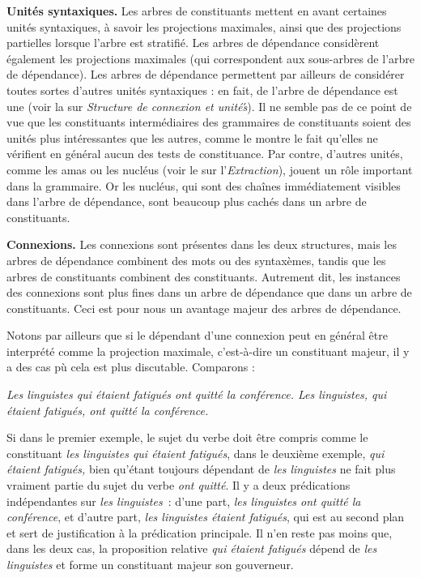 {    \smallskip\noindent\textbf{Unités syntaxiques.}
    Les arbres de constituants mettent en avant certaines unités syntaxiques, à savoir les projections maximales, ainsi que des projections partielles lorsque l’arbre est stratifié. Les arbres de dépendance considèrent également les projections maximales (qui correspondent aux sous-arbres de l’arbre de dépendance). Les arbres de dépendance permettent par ailleurs de considérer toutes sortes d’autres unités syntaxiques : en fait,  de l’arbre de dépendance est une  (voir la  sur \textit{Structure de connexion et unités}́). Il ne semble pas de ce point de vue que les constituants intermédiaires des grammaires de constituants soient des unités plus intéressantes que les autres, comme le montre le fait qu’elles ne vérifient en général aucun des tests de constituance. Par contre, d’autres unités, comme les amas ou les nucléus (voir le  sur l’\textit{Extraction}), jouent un rôle important dans la grammaire. Or les nucléus, qui sont des chaînes immédiatement visibles dans l’arbre de dépendance, sont beaucoup plus cachés dans un arbre de constituants.

     \smallskip\noindent\textbf{Connexions.}
    Les connexions sont présentes dans les deux structures, mais les arbres de dépendance combinent des mots ou des syntaxèmes, tandis que les arbres de constituants combinent des constituants. Autrement dit, les instances des connexions sont plus fines dans un arbre de dépendance que dans un arbre de constituants. Ceci est pour nous un avantage majeur des arbres de dépendance.

    Notons par ailleurs que si le dépendant d’une connexion peut en général être interprété comme la projection maximale, c’est-à-dire un constituant majeur, il y a des cas pù cela est plus discutable. Comparons :

    \ea
    \ea \itshape Les linguistes qui étaient fatigués ont quitté la conférence.
    \ex \itshape Les linguistes, qui étaient fatigués, ont quitté la conférence.
    \z
    \z

    Si dans le premier exemple, le sujet du verbe doit être compris comme le constituant \textit{les linguistes qui étaient fatigués}, dans le deuxième exemple, \textit{qui étaient fatigués,} bien qu’étant toujours dépendant de \textit{les linguistes} ne fait plus vraiment partie du sujet du verbe \textit{ont quitté}. Il y a deux prédications indépendantes sur \textit{les linguistes~}: d’une part, \textit{les linguistes ont quitté la conférence}, et d’autre part, \textit{les linguistes étaient fatigués}, qui est au second plan et sert de justification à la prédication principale.
    Il n'en reste pas moins que, dans les deux cas, la proposition relative \textit{qui étaient fatigués} dépend de \textit{les linguistes} et forme un constituant majeur son gouverneur.

}
